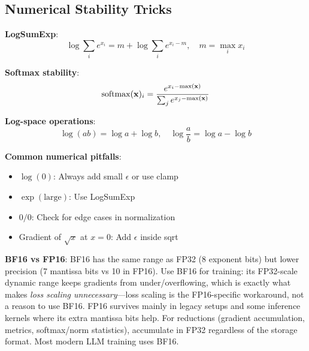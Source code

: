 \begin{interviewq}
\end{interviewq}

\subsection{Numerical Stability Tricks}

\textbf{LogSumExp}:
\begin{equation}
\log \sum_i e^{x_i} = m + \log \sum_i e^{x_i - m}, \quad m = \max_i x_i
\end{equation}

\textbf{Softmax stability}:
\begin{equation}
\operatorname{softmax}(\mathbf{x})_i = \frac{e^{x_i - \max(\mathbf{x})}}{\sum_j e^{x_j - \max(\mathbf{x})}}
\end{equation}

\textbf{Log-space operations}:
\begin{equation}
\log(ab) = \log a + \log b, \quad \log\frac{a}{b} = \log a - \log b
\end{equation}

\begin{warningbox}
\textbf{Common numerical pitfalls}:
\begin{itemize}
    \item $\log(0)$: Always add small $\epsilon$ or use clamp
    \item $\exp(\text{large})$: Use LogSumExp
    \item $0/0$: Check for edge cases in normalization
    \item Gradient of $\sqrt{x}$ at $x=0$: Add $\epsilon$ inside sqrt
\end{itemize}
\end{warningbox}

\begin{warningbox}
\textbf{BF16 vs FP16}: BF16 has the same range as FP32 (8 exponent bits) but lower precision (7 mantissa bits vs 10 in FP16). Use BF16 for training: its FP32-scale dynamic range keeps gradients from under/overflowing, which is exactly what makes \textit{loss scaling unnecessary}---loss scaling is the FP16-specific workaround, not a reason to use BF16. FP16 survives mainly in legacy setups and some inference kernels where its extra mantissa bits help. For reductions (gradient accumulation, metrics, softmax/norm statistics), accumulate in FP32 regardless of the storage format. Most modern LLM training uses BF16.
\end{warningbox}

